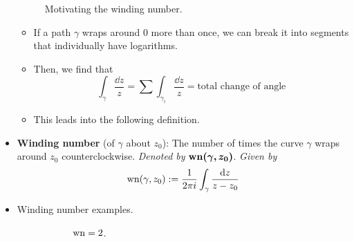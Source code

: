 \documentclass[../notes.tex]{subfiles}
\begin{document}
\begin{itemize}
\begin{figure}[h!]
        \caption{Motivating the winding number.}
        \label{fig:windingNumberMotivation}
    \end{figure}
    \begin{itemize}
        \item If a path $\gamma$ wraps around 0 more than once, we can break it into segments that individually have logarithms.
        \item Then, we find that
        \begin{equation*}
            \int_\gamma\frac{\dd{z}}{z} = \sum\int_{\gamma_i}\frac{\dd{z}}{z}
            = \text{total change of angle}
        \end{equation*}
        \item This leads into the following definition.
    \end{itemize}
    \item \textbf{Winding number} (of $\gamma$ about $z_0$): The number of times the curve $\gamma$ wraps around $z_0$ counterclockwise. \emph{Denoted by} $\bm{\wn(\gamma,z_0)}$. \emph{Given by}
    \begin{equation*}
        \operatorname{wn}(\gamma,z_0) := \frac{1}{2\pi i}\int_\gamma\frac{\dd{z}}{z-z_0}
    \end{equation*}
    \item Winding number examples.
    \begin{figure}[H]
        \centering
        \begin{subfigure}[b]{0.25\linewidth}
            \centering
            \caption{$\operatorname{wn}=2$.}
            \label{fig:windingNumberExa}
        \end{subfigure}
        \begin{subfigure}[b]{0.25\linewidth}
            \centering
\end{subfigure}
\end{figure}
\end{itemize}
\end{document}
